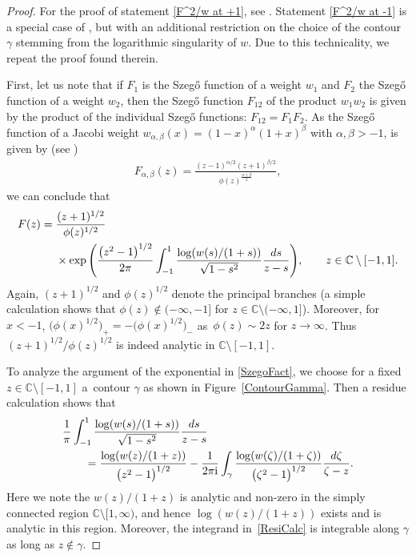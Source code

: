 \documentclass[11pt]{article}
\numberwithin{equation}{section}
\newcommand{\C}{\mathbb{C}}
\newcommand{\I}{\mathrm{i}}
\numberwithin{equation}{section}
\begin{document}
\begin{proof}
For the proof of statement \eqref{F^2/w at +1}, see \cite[Proposition~A.1]{CD}. Statement \eqref{F^2/w at -1} is a special case of \cite[Lemma~6.6]{KMVV}, but with an additional restriction on the choice of the contour $\gamma$ stemming from the logarithmic singularity of $w$. Due to this technicality, we repeat the proof found therein.

First, let us note that if $F_1$ is the Szeg\H{o} function of a weight $w_1$ and $F_2$ the Szeg\H{o} function of a weight $w_2$, then the Szeg\H{o} function $F_{12}$ of the product $w_1w_2$ is given by the product of the individual Szeg\H{o} functions: $F_{12} = F_1 F_2$. As the Szeg\H{o} function of a Jacobi weight $w_{\alpha,\beta}(x) = (1-x)^\alpha (1+x)^\beta$ with $\alpha, \beta > -1$, is given by (see \cite[Remark 5.1]{KMVV})
\begin{align*}
 F_{\alpha,\beta}(z) = \frac{(z-1)^{\alpha/2}(z+1)^{\beta/2}}{\phi(z)^{\frac{\alpha+\beta}{2}}},
\end{align*}
we can conclude that
\begin{align}
 F(z) ={}& \frac{(z+1)^{1/2}}{\phi(z)^{1/2}}\nonumber\\
 &\times\exp \Bigg( \dfrac{\big(z^2-1\big)^{1/2}}{2 \pi}\int_{-1}^1 \dfrac{\log (w(s)/(1+s))}{\sqrt{1-s^2}} \dfrac{{\rm d}s}{z-s} \Bigg),
 \qquad z \in \C \setminus [-1,1].\label{SzegoFact}
\end{align}
Again, $(z+1)^{1/2}$ and $\phi(z)^{1/2}$ denote the principal branches (a simple calculation shows that $\phi(z) \not \in (-\infty, -1]$ for $z \in \C \setminus (-\infty, 1]$). Moreover, for $x < -1$, $\big(\phi(x)^{1/2}\big)_+ = -\big(\phi(x)^{1/2}\big)_-$ as~$\phi(z) \sim 2z$ for $z \to \infty$. Thus $(z+1)^{1/2}/\phi(z)^{1/2}$ is indeed analytic in $\C\setminus [-1,1]$.

To analyze the argument of the exponential in \eqref{SzegoFact}, we choose for a fixed $z \in \C \setminus [-1,1]$ a~contour $\gamma$ as shown in Figure~\ref{ContourGamma}. Then a residue calculation shows that
\begin{align}\nonumber
 &\frac{1}{\pi} \int_{-1}^1 \frac{\log(w(s)/(1+s))}{\sqrt{1-s^2}} \frac{{\rm d}s}{z-s}
 \\\label{ResiCalc}
 &\qquad= \frac{\log(w(z)/(1+z))}{\big(z^2-1\big)^{1/2}} - \frac{1}{2\pi\I} \int_\gamma\frac{\log(w(\zeta)/(1+\zeta))}{\big(\zeta^2-1\big)^{1/2}} \frac{{\rm d}\zeta}{\zeta-z}.
\end{align}
Here we note the $w(z)/(1+z)$ is analytic and non-zero in the simply connected region $\C \setminus [1,\infty)$, and hence $\log(w(z)/(1+z))$ exists and is analytic in this region. Moreover, the integrand in~\eqref{ResiCalc} is integrable along $\gamma$ as long as $z \not \in \gamma$.


\end{proof}
\end{document}
